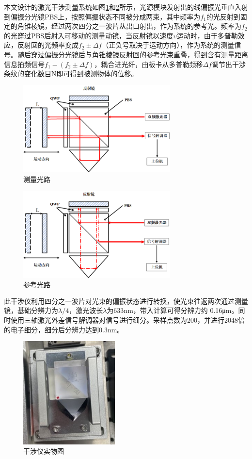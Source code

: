 \documentclass[type=master,oneside]{fduthesis}
\begin{document}
本文设计的激光干涉测量系统如图\ref{fig:测量光路}和\ref{fig:参考光路}所示，光源模块发射出的线偏振光垂直入射到偏振分光镜PBS上，按照偏振状态不同被分成两束，其中频率为$f_{1}$的光反射到固定的角锥棱镜，经过两次四分之一波片从出口射出，作为系统的参考光。频率为$f_{2}$的光穿过PBS后射入可移动的测量动镜，当反射镜以速度$\upsilon $运动时，由于多普勒效应，反射回的光频率变成$f_{2} \pm \Delta f$（正负号取决于运动方向），作为系统的测量信号。随后穿过偏振分光镜后与角锥棱镜反射回的参考光束重叠，得到含有测量距离信息拍频信号$f_{1}-\left(f_{2} \pm \Delta f\right)$，耦合进光纤，由板卡从多普勒频移$\Delta f$调节出干涉条纹的变化数目N即可得到被测物体的位移。
\begin{figure}[H]
  \centering
  \includegraphics[width=8cm]{5-fig/测量光路.png}
  \caption{测量光路}
  \label{fig:测量光路}
\end{figure}
\begin{figure}[H]
  \centering
  \includegraphics[width=8cm]{5-fig/参考光路.png}
  \caption{参考光路}
  \label{fig:参考光路}
\end{figure}
此干涉仪利用四分之一波片对光束的偏振状态进行转换，使光束往返两次通过测量镜，基础分辨力为$\lambda /4$，激光波长$\lambda$为633nm，带入计算可得分辨力约 0.16μm。同时使用三轴激光外差信号解调器对信号进行细分。采样点数为200，并进行2048倍的电子细分，细分后分辨力达到0.3nm。
\begin{figure}[H]
  \centering
  \includegraphics[width=5cm]{5-fig/干涉仪实物图.jpg}
  \caption{干涉仪实物图}
  \label{fig:干涉仪实物图}
\end{figure}
\end{document}
